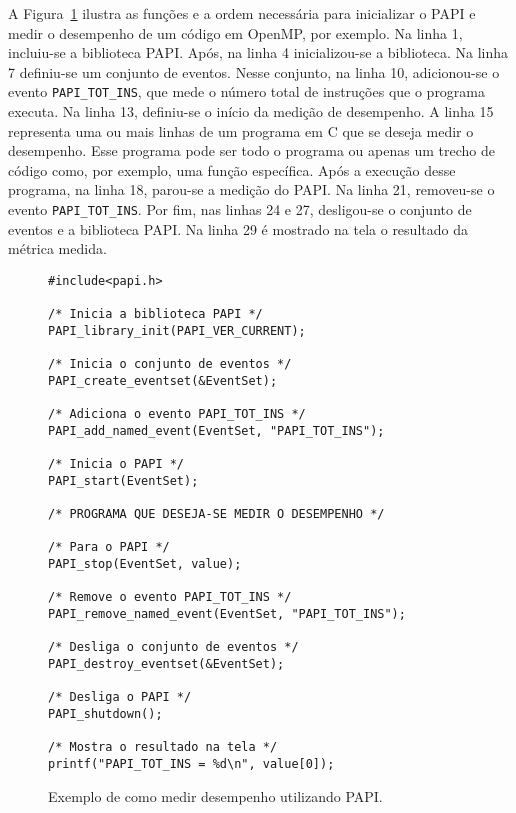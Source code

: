 A Figura~\ref{fig:papi:tool} ilustra as funções e a ordem necessária para inicializar o PAPI e medir o desempenho de um código em OpenMP, por exemplo. Na linha 1, incluiu-se a biblioteca PAPI. Após, na linha 4 inicializou-se a biblioteca. Na linha 7 definiu-se um conjunto de eventos. Nesse conjunto, na linha 10, adicionou-se o evento \texttt{PAPI\_TOT\_INS}, que mede o número total de instruções que o programa executa. Na linha 13, definiu-se o início da medição de desempenho. A linha 15 representa uma ou mais linhas de um programa em C que se deseja medir o desempenho. Esse programa pode ser todo o programa ou apenas um trecho de código como, por exemplo, uma função específica. 
Após a execução desse programa, na linha 18, parou-se a medição do PAPI. Na linha 21, removeu-se o evento \texttt{PAPI\_TOT\_INS}. Por fim, nas linhas 24 e 27, desligou-se o conjunto de eventos e a biblioteca PAPI. Na linha 29 é mostrado na tela o resultado da métrica medida.

\begin{figure}[!htb]
\centering
\begin{lstlisting}
#include<papi.h>

/* Inicia a biblioteca PAPI */
PAPI_library_init(PAPI_VER_CURRENT);

/* Inicia o conjunto de eventos */
PAPI_create_eventset(&EventSet);

/* Adiciona o evento PAPI_TOT_INS */
PAPI_add_named_event(EventSet, "PAPI_TOT_INS");

/* Inicia o PAPI */
PAPI_start(EventSet);

/* PROGRAMA QUE DESEJA-SE MEDIR O DESEMPENHO */

/* Para o PAPI */
PAPI_stop(EventSet, value);

/* Remove o evento PAPI_TOT_INS */
PAPI_remove_named_event(EventSet, "PAPI_TOT_INS");

/* Desliga o conjunto de eventos */
PAPI_destroy_eventset(&EventSet);

/* Desliga o PAPI */
PAPI_shutdown();

/* Mostra o resultado na tela */
printf("PAPI_TOT_INS = %d\n", value[0]);
\end{lstlisting}
\caption{Exemplo de como medir desempenho utilizando PAPI.}
\label{fig:papi:tool}
\end{figure}
